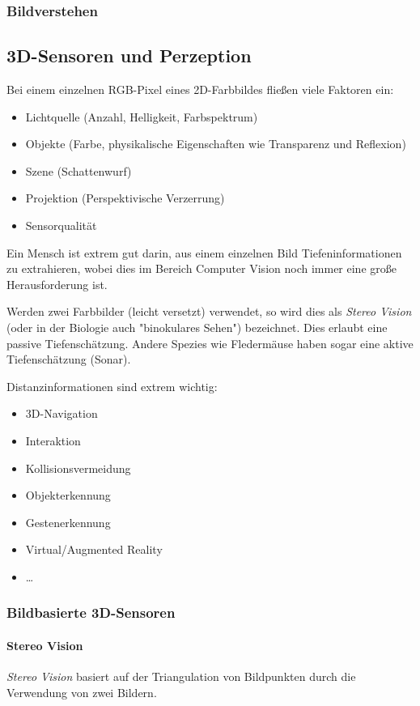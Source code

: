 			\subsubsection{Bildverstehen} %

		\subsection{3D-Sensoren und Perzeption}
			Bei einem einzelnen RGB-Pixel eines 2D-Farbbildes fließen viele Faktoren ein:
			\begin{itemize}
				\item Lichtquelle (Anzahl, Helligkeit, Farbspektrum)
				\item Objekte (Farbe, physikalische Eigenschaften wie Transparenz und Reflexion)
				\item Szene (Schattenwurf)
				\item Projektion (Perspektivische Verzerrung)
				\item Sensorqualität
			\end{itemize}
			Ein Mensch ist extrem gut darin, aus einem einzelnen Bild Tiefeninformationen zu extrahieren, wobei dies im Bereich Computer Vision noch immer eine große Herausforderung ist.
			
			Werden zwei Farbbilder (leicht versetzt) verwendet, so wird dies als \emph{Stereo Vision} (oder in der Biologie auch "binokulares Sehen") bezeichnet. Dies erlaubt eine passive Tiefenschätzung. Andere Spezies wie Fledermäuse haben sogar eine aktive Tiefenschätzung (Sonar).
			
			Distanzinformationen sind extrem wichtig:
			\begin{itemize}
				\item 3D-Navigation
				\item Interaktion
				\item Kollisionsvermeidung
				\item Objekterkennung
				\item Gestenerkennung
				\item Virtual/Augmented Reality
				\item \dots
			\end{itemize}

			\subsubsection{Bildbasierte 3D-Sensoren}
				\paragraph{Stereo Vision}
					\emph{Stereo Vision} basiert auf der Triangulation von Bildpunkten durch die Verwendung von zwei Bildern.
					
